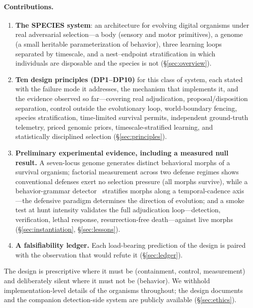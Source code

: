 \documentclass[11pt,a4paper]{article}
\begin{document}
\paragraph{Contributions.}
\begin{enumerate}[leftmargin=1.6em,itemsep=1pt]
  \item \textbf{The SPECIES system}: an architecture for evolving digital organisms under real adversarial selection---a body (sensory and motor primitives), a genome (a small heritable parameterization of behavior), three learning loops separated by timescale, and a nest--endpoint stratification in which individuals are disposable and the species is not (\S\ref{sec:overview}).
  \item \textbf{Ten design principles (DP1--DP10)} for this class of system, each stated with the failure mode it addresses, the mechanism that implements it, and the evidence observed so far---covering real adjudication, proposal/disposition separation, control outside the evolutionary loop, world-boundary fencing, species stratification, time-limited survival permits, independent ground-truth telemetry, priced genomic priors, timescale-stratified learning, and statistically disciplined selection (\S\ref{sec:principles}).
  \item \textbf{Preliminary experimental evidence, including a measured null result.} A seven-locus genome generates distinct behavioral morphs of a survival organism; factorial measurement across two defense regimes shows conventional defenses exert no selection pressure (all morphs survive), while a behavior-grammar detector~\cite{luo2026grammar} stratifies morphs along a temporal-cadence axis---the defensive paradigm determines the direction of evolution; and a smoke test at hunt intensity validates the full adjudication loop---detection, verification, lethal response, resurrection-free death---against live morphs (\S\ref{sec:instantiation}, \S\ref{sec:lessons}).
  \item \textbf{A falsifiability ledger.} Each load-bearing prediction of the design is paired with the observation that would refute it (\S\ref{sec:ledger}).
\end{enumerate}

The design is prescriptive where it must be (containment, control, measurement) and deliberately silent where it must not be (behavior). We withhold implementation-level details of the organisms throughout; the design documents and the companion detection-side system are publicly available (\S\ref{sec:ethics}).
\end{document}

